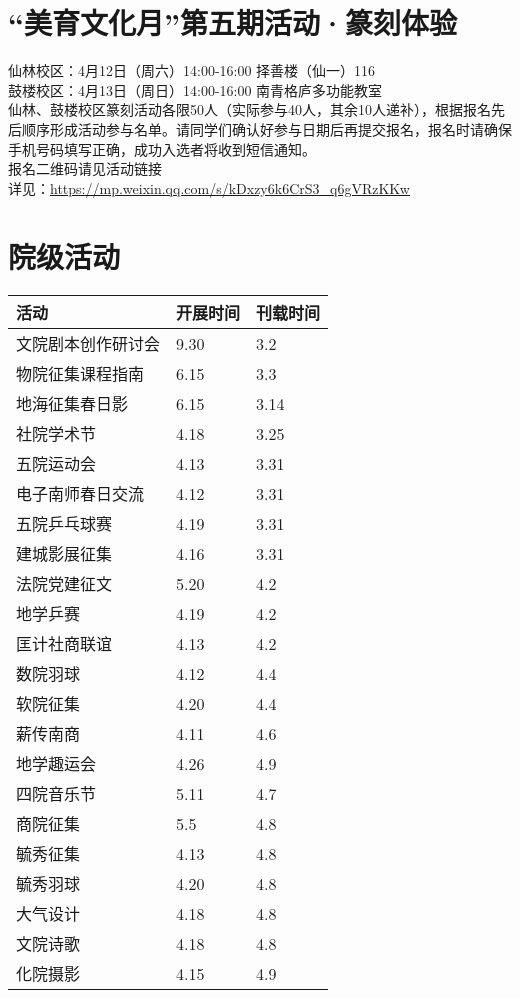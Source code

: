\documentclass[letterpaper, 12pt]{article}
\begin{document}
\begin{multicols}{2}
\section{“美育文化月”第五期活动·篆刻体验}
仙林校区：4月12日（周六）14:00-16:00 择善楼（仙一）116
\\鼓楼校区：4月13日（周日）14:00-16:00 南青格庐多功能教室
\\仙林、鼓楼校区篆刻活动各限50人（实际参与40人，其余10人递补），根据报名先后顺序形成活动参与名单。请同学们确认好参与日期后再提交报名，报名时请确保手机号码填写正确，成功入选者将收到短信通知。
\\报名二维码请见活动链接
\\详见：\url{https://mp.weixin.qq.com/s/kDxzy6k6CrS3_q6gVRzKKw}
\section{院级活动}
\begin{tabular}{|>{\centering\arraybackslash}m{}|m{}|m{}|}
\hline
    活动 & 开展时间 & 刊载时间\\
    \hline\hline
    文院剧本创作研讨会 & 9.30 & 3.2\\
    物院征集课程指南 & 6.15 & 3.3\\
    地海征集春日影 & 6.15 & 3.14\\
    社院学术节 & 4.18 & 3.25\\
    五院运动会 & 4.13 & 3.31\\
    电子南师春日交流 & 4.12 & 3.31\\
    五院乒乓球赛 & 4.19 & 3.31\\
    建城影展征集 & 4.16 & 3.31\\
    法院党建征文 & 5.20 & 4.2\\
    地学乒赛 & 4.19 & 4.2\\
    匡计社商联谊 & 4.13 & 4.2\\
    数院羽球 & 4.12 & 4.4\\
    软院征集 & 4.20 & 4.4\\
    薪传南商 & 4.11 & 4.6\\
    地学趣运会 & 4.26 & 4.9\\
    四院音乐节 & 5.11 & 4.7\\
    商院征集 & 5.5 & 4.8\\
    毓秀征集 & 4.13 & 4.8\\
    毓秀羽球 & 4.20 & 4.8\\
    大气设计 & 4.18 & 4.8\\
    文院诗歌 & 4.18 & 4.8\\
    化院摄影 & 4.15 & 4.9\\
    \hline
\end{tabular}


\end{multicols}
\end{document}
